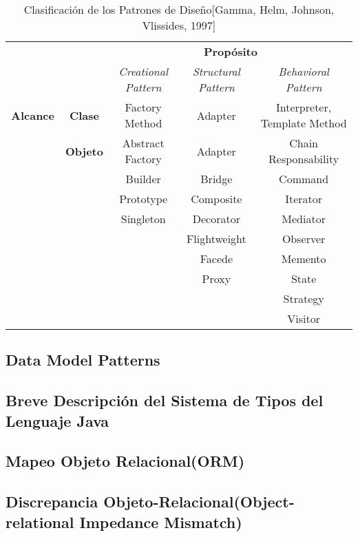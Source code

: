 \begin{center}
    \begin{table}[H]
        \begin{tabular}{|c|c|c|c|c|}
            \cline{3-5}
            \multicolumn{1}{c}{} & \multicolumn{1}{c|}{} & \multicolumn{3}{c|}{\textbf{Propósito}}\\
            \cline{3-5}
            \multicolumn{1}{c}{} & \multicolumn{1}{c|}{} & \multicolumn{1}{c|}{\textit{Creational Pattern}} &
                                   \multicolumn{1}{c|}{\textit{Structural Pattern}} &
                                   \multicolumn{1}{c|}{\textit{Behavioral Pattern}}\\
            \hline
            \textbf{Alcance} & \textbf{Clase}  & Factory Method   & Adapter      & Interpreter, \newline Template Method\\ \cline{2-5}
                             & \textbf{Objeto} & Abstract Factory & Adapter      & Chain Responsability\\
                             &                 & Builder          & Bridge       & Command \\
                             &                 & Prototype        & Composite    & Iterator\\
                             &                 & Singleton        & Decorator    & Mediator\\
                             &                 &                  & Flightweight & Observer\\
                             &                 &                  & Facede       & Memento\\
                             &                 &                  & Proxy        & State\\
                             &                 &                  &              & Strategy\\
                             &                 &                  &              & Visitor\\
            \hline
        \end{tabular}
        \caption{Clasificación de los Patrones de Diseño[Gamma, Helm, Johnson, Vlissides, 1997]}
    \end{table}
\end{center}
\subsection{Data Model Patterns}
\subsection{Breve Descripción del Sistema de Tipos del Lenguaje Java}
\subsection{Mapeo Objeto Relacional(ORM)}
\subsection{Discrepancia Objeto-Relacional(Object-relational Impedance Mismatch)}
\noindent